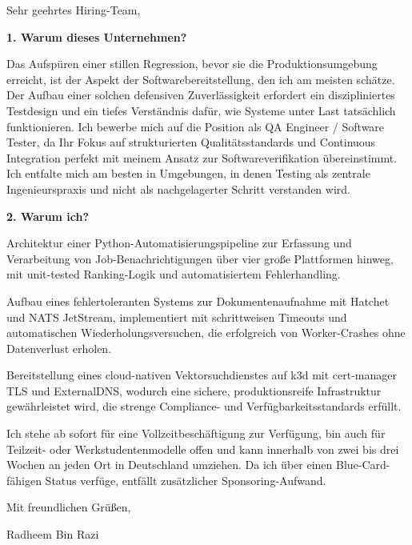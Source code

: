\documentclass[11pt,a4paper]{coverletter}
\begin{document}

\opening{Sehr geehrtes Hiring-Team,}

\vspace{8pt}\noindent\textbf{1. Warum dieses Unternehmen?}\par\vspace{3pt}

Das Aufspüren einer stillen Regression, bevor sie die Produktionsumgebung erreicht, ist der Aspekt der Softwarebereitstellung, den ich am meisten schätze. Der Aufbau einer solchen defensiven Zuverlässigkeit erfordert ein diszipliniertes Testdesign und ein tiefes Verständnis dafür, wie Systeme unter Last tatsächlich funktionieren. Ich bewerbe mich auf die Position als QA Engineer / Software Tester, da Ihr Fokus auf strukturierten Qualitätsstandards und Continuous Integration perfekt mit meinem Ansatz zur Softwareverifikation übereinstimmt. Ich entfalte mich am besten in Umgebungen, in denen Testing als zentrale Ingenieurspraxis und nicht als nachgelagerter Schritt verstanden wird.

\vspace{8pt}\noindent\textbf{2. Warum ich?}\par\vspace{3pt}

\bullets

  \item Architektur einer Python-Automatisierungspipeline zur Erfassung und Verarbeitung von Job-Benachrichtigungen über vier große Plattformen hinweg, mit unit-tested Ranking-Logik und automatisiertem Fehlerhandling.

  \item Aufbau eines fehlertoleranten Systems zur Dokumentenaufnahme mit Hatchet und NATS JetStream, implementiert mit schrittweisen Timeouts und automatischen Wiederholungsversuchen, die erfolgreich von Worker-Crashes ohne Datenverlust erholen.

  \item Bereitstellung eines cloud-nativen Vektorsuchdienstes auf k3d mit cert-manager TLS und ExternalDNS, wodurch eine sichere, produktionsreife Infrastruktur gewährleistet wird, die strenge Compliance- und Verfügbarkeitsstandards erfüllt.

\bulletsend

Ich stehe ab sofort für eine Vollzeitbeschäftigung zur Verfügung, bin auch für Teilzeit- oder Werkstudentenmodelle offen und kann innerhalb von zwei bis drei Wochen an jeden Ort in Deutschland umziehen. Da ich über einen Blue-Card-fähigen Status verfüge, entfällt zusätzlicher Sponsoring-Aufwand.

\closing{Mit freundlichen Grüßen,}{Radheem Bin Razi}
\end{document}
